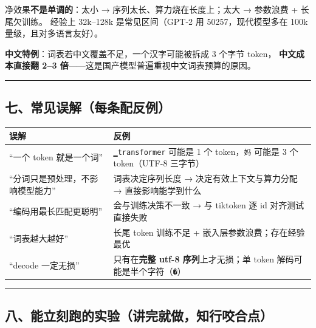 \documentclass[
  chinese,
  11pt,
]{ctexart}
\newcounter{none} %
\begin{document}
净效果\textbf{不是单调的}：太小 → 序列太长、算力烧在长度上；太大 → 参数浪费 + 长尾欠训练。 经验上 32k--128k 是常见区间（GPT-2 用 50257，现代模型多在 100k 量级，且对多语言友好）。

\textbf{中文特例}：词表若中文覆盖不足，一个汉字可能被拆成 3 个字节 token， \textbf{中文成本直接翻 2--3 倍}------这是国产模型普遍重视中文词表预算的原因。

\begin{center}\rule{0.5\linewidth}{0.5pt}\end{center}

\subsection{七、常见误解（每条配反例）}\label{ux4e03ux5e38ux89c1ux8befux89e3ux6bcfux6761ux914dux53cdux4f8b}

{\def\LTcaptype{none} %
\begin{longtable}[]{@{}
  >{\raggedright\arraybackslash}p{}
  >{\raggedright\arraybackslash}p{}@{}}
\toprule\noalign{}
\begin{minipage}[b]{\linewidth}\raggedright
误解
\end{minipage} & \begin{minipage}[b]{\linewidth}\raggedright
反例
\end{minipage} \\
\midrule\noalign{}
\endhead
\bottomrule\noalign{}
\endlastfoot
``一个 token 就是一个词'' & \texttt{▁transformer} 可能是 1 个 token，\texttt{妈} 可能是 3 个 token（UTF-8 三字节） \\
``分词只是预处理，不影响模型能力'' & 词表决定序列长度 → 决定有效上下文与算力分配 → 直接影响能学到什么 \\
``编码用最长匹配更聪明'' & 会与训练决策不一致 → 与 tiktoken 逐 id 对齐测试直接失败 \\
``词表越大越好'' & 长尾 token 训练不足 + 嵌入层参数浪费；存在经验最优 \\
``decode 一定无损'' & 只有在\textbf{完整 utf-8 序列}上才无损；单 token 解码可能是半个字符（\texttt{�}） \\
\end{longtable}
}

\begin{center}\rule{0.5\linewidth}{0.5pt}\end{center}

\subsection{八、能立刻跑的实验（讲完就做，知行咬合点）}\label{ux516bux80fdux7acbux523bux8dd1ux7684ux5b9eux9a8cux8bb2ux5b8cux5c31ux505aux77e5ux884cux54acux5408ux70b9}
\end{document}

